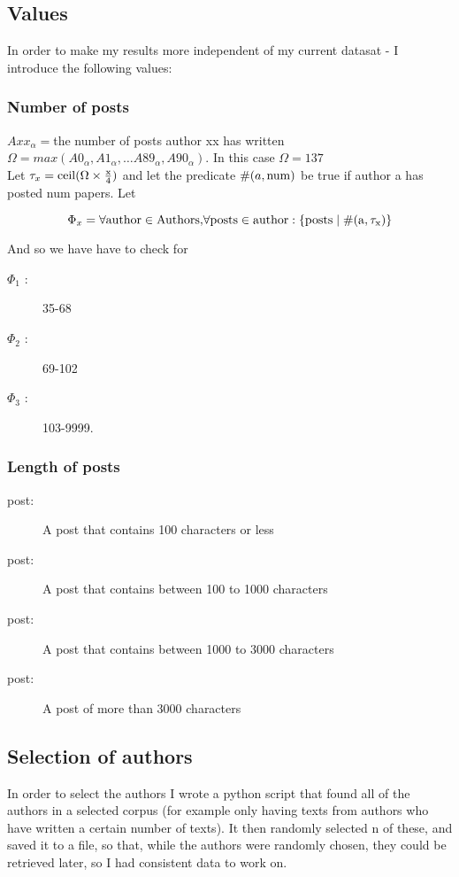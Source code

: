 \subsection{Values}
In order to make my results more independent of my current datasat - I introduce the following values:

\subsubsection*{Number of posts}
$Axx_{\alpha} = $the number of posts author xx has written\\ 
$\Omega = max(A0_\alpha, A1_\alpha, \ldots A89_\alpha, A90_\alpha)$. In this case $\Omega = 137$\\

Let $\tau_x = \rm{ceil}(\Omega \times \frac{x}{4})$ and let the predicate $\#(a, \rm{num})$ be true if author a has posted num papers. Let 

$$\Phi_x = \forall\rm{ author }\in\rm{ Authors, }\forall\rm{ posts }\in\rm{ author }: \{\rm{posts }\mid \#(a, \tau_x)\}$$ 
 
And so we have have to check for 
\begin{description}
\item[$\Phi_1$ :] 35-68
\item[$\Phi_2$ :] 69-102
\item[$\Phi_3$ :] 103-9999.
\end{description}

\subsubsection*{Length of posts}

\begin{description}
\item[ post:] A post that contains 100 characters or less
\item[ post:] A post that contains between 100 to 1000 characters
\item[ post:] A post that contains between 1000 to 3000 characters
\item[ post:] A post of more than 3000 characters
\end{description}

\subsection{Selection of authors}
In order to select the authors I wrote a python script that found all of the authors in a selected corpus (for example only having texts from authors who have written a certain number of texts). It then randomly selected n of these, and saved it to a file, so that, while the authors were randomly chosen, they could be retrieved later, so I had consistent data to work on.

